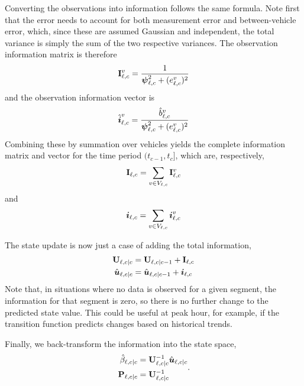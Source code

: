 Converting the observations into information follows the same formula. Note first that the error needs to account for both measurement error and between-vehicle error, which, since these are assumed Gaussian and independent, the total variance is simply the sum of the two respective variances. The observation information matrix is therefore
\begin{equation}\label{eq:nw_if_inf_obsmatrix}
\mathbf{I}_{\ell,c}^v = \frac{1}{\mathbf{\boldsymbol{\psi}}_{\ell,c}^2 + (e_{\ell,c}^v)^2}
\end{equation}
and the observation information vector is
\begin{equation}\label{eq:nw_if_inf_obsvector}
\hat{\boldsymbol{i}}_{\ell,c}^v = \frac{\hat{b}_{\ell,c}^v}{
    \mathbf{\boldsymbol{\psi}}_{\ell,c}^2 + (e_{\ell,c}^v)^2
}
\end{equation}
Combining these by summation over vehicles yields the complete information matrix and vector for the time period $(t_{c-1},t_c]$, which are, respectively,
\begin{equation}\label{eq:nw_if_obsupdate_matrix}
\mathbf{I}_{\ell,c} = \sum_{v\in V_{\ell,c}} \mathbf{I}_{\ell,c}^v
\end{equation}
and
\begin{equation}\label{eq:nw_if_obsupdate_vector}
\boldsymbol{i}_{\ell,c} = \sum_{v \in V_{\ell,c}} \boldsymbol{i}_{\ell,c}^v
\end{equation}



The state update is now just a case of adding the total information,
\begin{equation}
\label{eq:nw_if_update}
\begin{split}
\mathbf{U}_{\ell,c|c} &= \mathbf{U}_{\ell,c|c-1} + \mathbf{I}_{\ell,c} \\
\hat{\boldsymbol{u}}_{\ell,c|c} &= \hat{\boldsymbol{u}}_{\ell,c|c-1} + \boldsymbol{i}_{\ell,c}
\end{split}
\end{equation}
Note that, in situations where no data is observed for a given segment, the information for that segment is zero, so there is no further change to the predicted state value. This could be useful at peak hour, for example, if the transition function predicts changes based on historical trends.


Finally, we back-transform the information into the state space,
\begin{equation}
\label{eq:nw_if_statespace}
\begin{split}
\hat{\beta}_{\ell,c|c} &= \mathbf{U}_{\ell,c|c}^{-1} \hat{\boldsymbol{u}}_{\ell,c|c} \\
\mathbf{P}_{\ell,c|c} &= \mathbf{U}_{\ell,c|c}^{-1}
\end{split}.
\end{equation}

